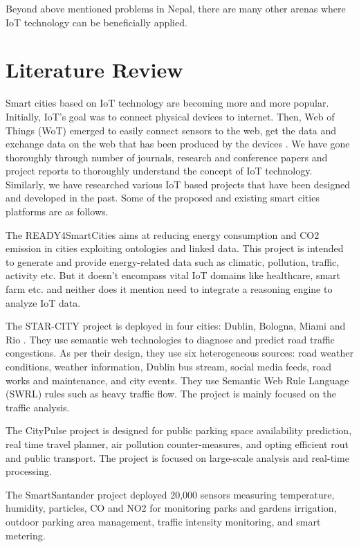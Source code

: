 \documentclass[journal,twoside]{IEEEtran}
\begin{document}
Beyond above mentioned problems in Nepal, there are
many other arenas where IoT technology can be beneficially
applied.

\section{Literature Review}

Smart cities based on IoT technology are becoming more and
more popular. Initially, IoT's goal was to connect physical
devices to internet. Then, Web of Things (WoT) emerged to
easily connect sensors to the web, get the data and exchange
data on the web that has been produced by the devices \cite{Zeng2011}. We
have gone thoroughly through number of journals, research and
conference papers and project reports to thoroughly understand
the concept of IoT technology. Similarly, we have researched
various IoT based projects that have been designed and
developed in the past. Some of the proposed and existing smart
cities platforms are as follows.

The READY4SmartCities \cite{Raul2014} aims at reducing energy
consumption and CO2 emission in cities exploiting ontologies
and linked data. This project is intended to generate and provide
energy-related data such as climatic, pollution, traffic, activity
etc. But it doesn’t encompass vital IoT domains like healthcare,
smart farm etc. and neither does it mention need to integrate a
reasoning engine to analyze IoT data.

The STAR-CITY project is deployed in four cities: Dublin,
Bologna, Miami and Rio \cite{Lecue2014}. They use semantic web
technologies to diagnose and predict road traffic congestions. As per their design, they use six heterogeneous sources: road
weather conditions, weather information, Dublin bus stream,
social media feeds, road works and maintenance, and city
events. They use Semantic Web Rule Language (SWRL) rules
such as heavy traffic flow. The project is mainly focused on the
traffic analysis.

The CityPulse \cite{Barnaghi2014} project is designed for public parking space
availability prediction, real time travel planner, air pollution
counter-measures, and opting efficient rout and public
transport. The project is focused on large-scale analysis and
real-time processing.

The SmartSantander\cite{Sanchez2011} project deployed 20,000 sensors
measuring temperature, humidity, particles, CO and NO2 for
monitoring parks and gardens irrigation, outdoor parking area
management, traffic intensity monitoring, and smart metering.
\end{document}
